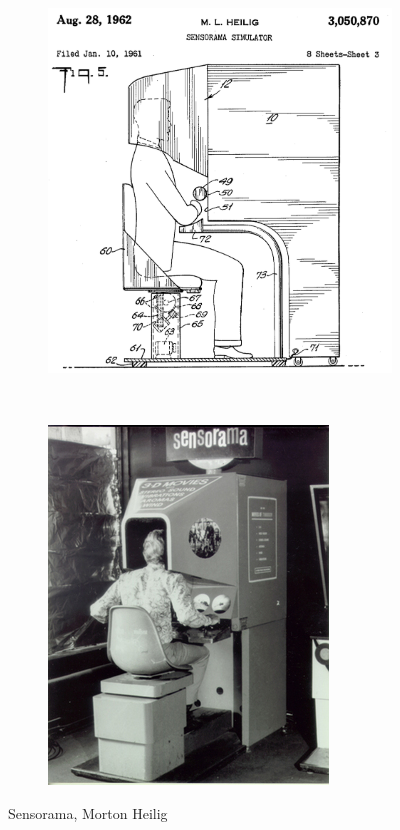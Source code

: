 \documentclass[a4,12pt]{scrartcl}
\begin{document}
\begin{figure}[H]
	\centering
	\begin{subfigure}{.4\textwidth}
	  \centering
	  \includegraphics[width=\linewidth]{sensorama-patent}
	\end{subfigure}
	~
	\begin{subfigure}{.4\textwidth}
	  \centering
	  \includegraphics[width=0.8\linewidth]{sensorama}
	\end{subfigure}

 	\caption{Sensorama, Morton Heilig}
\end{figure}
\end{document}

